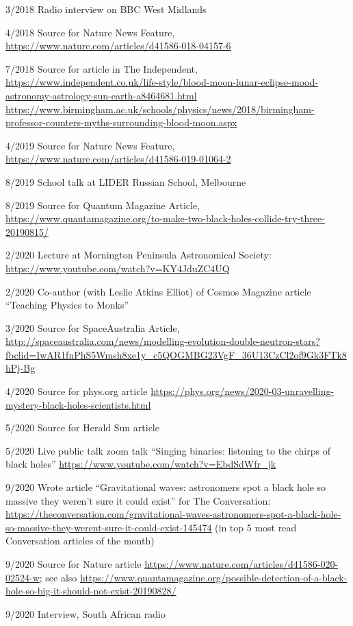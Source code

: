 \documentclass[margin,line]{res}
\begin{document}
\begin{resume}
3/2018	Radio interview on BBC West Midlands

4/2018	Source for Nature News Feature, \url{https://www.nature.com/articles/d41586-018-04157-6}

7/2018 	Source for article in The Independent, \url{https://www.independent.co.uk/life-style/blood-moon-lunar-eclipse-mood-astronomy-astrology-sun-earth-a8464681.html}\\
\url{https://www.birmingham.ac.uk/schools/physics/news/2018/birmingham-professor-counters-myths-surrounding-blood-moon.aspx}

4/2019	Source for Nature News Feature, \url{https://www.nature.com/articles/d41586-019-01064-2}

8/2019	School talk at LIDER Russian School, Melbourne

8/2019 	Source for Quantum Magazine Article, \url{https://www.quantamagazine.org/to-make-two-black-holes-collide-try-three-20190815/}

2/2020	Lecture at Mornington Peninsula Astronomical Society: \url{https://www.youtube.com/watch?v=KY4JduZC4UQ}

2/2020	Co-author (with Leslie Atkins Elliot) of Cosmos Magazine article ``Teaching Physics to Monks''
	
3/2020 	Source for SpaceAustralia Article, \url{http://spaceaustralia.com/news/modelling-evolution-double-neutron-stars?fbclid=IwAR1fnPhS5Wmsh8xe1y_c5QOGMBG23VgF_36U13CzCl2of9Gk3FTk8hPj-Bg}
	  
4/2020	Source for phys.org article \url{https://phys.org/news/2020-03-unravelling-mystery-black-holes-scientists.html}

5/2020	Source for Herald Sun article

5/2020	Live public talk zoom talk ``Singing binaries: listening to the chirps of black holes'' \url{https://www.youtube.com/watch?v=EbdSdWfr_jk}

9/2020	Wrote article ``Gravitational waves: astronomers spot a black hole so massive they weren't sure it could exist'' for The Conversation: \url{https://theconversation.com/gravitational-waves-astronomers-spot-a-black-hole-so-massive-they-werent-sure-it-could-exist-145474} (in top 5 most read Conversation articles of the month)

9/2020	Source for Nature article \url{https://www.nature.com/articles/d41586-020-02524-w}; see also \url{https://www.quantamagazine.org/possible-detection-of-a-black-hole-so-big-it-should-not-exist-20190828/}

9/2020	Interview, South African radio


\end{resume}
\end{document}
